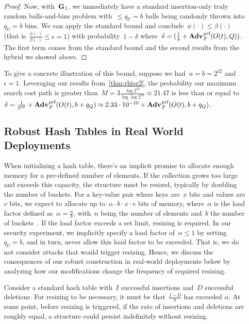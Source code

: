 \begin{proof}
    Now, with~$\textup{\textbf{G}}\hspace{0.5pt}_1$, we immediately have a standard insertion-only truly random balls-and-bins problem with~$\leq q_U = b$ balls being randomly thrown into~$q_U = b$ bins. We can apply the standard bound and conclude~$\phi(\cdot) \leq \beta (\cdot)$ (that is~$\frac{\phi(\cdot)}{\beta (\cdot)} \leq \epsilon = 1$) with probability~$1-\delta$ where~$\delta = (\frac{1}{b} + \Adv{\text{prf}}_{F}(O(t),Q))$. The first term comes from the standard bound and the second results from the hybrid we showed above.
\end{proof} 

To give a concrete illustration of this bound, suppose we had~$n = b = 2^{32}$ and~$\epsilon = 1$. Leveraging our results from~\cref{thm:rhtsr2}, the probability our maximum search cost path is greater than~$M = 3 \frac{\log 2^{32}}{\log\log 2^{32}} \approx 21.47$ is less than or equal to $\delta = \frac{1}{2^{32}} + \Adv{\text{prf}}_{F}(O(t),b+q_Q) \approx 2.33 \cdot 10^{-10} + \Adv{\text{prf}}_{F}(O(t),b+q_Q)$.

\subsection{Robust Hash Tables in Real World Deployments}

When initializing a hash table, there's an implicit promise to allocate enough memory for a pre-defined number of elements. If the collection grows too large and exceeds this capacity, the structure must be resized, typically by doubling the number of buckets. For a key-value pair where keys are~$x$ bits and values are~$v$ bits, we expect to allocate up to~$\alpha \cdot b \cdot x \cdot v$ bits of memory, where~$\alpha$ is the load factor defined as~$\alpha = \frac{n}{b}$, with~$n$ being the number of elements and~$b$ the number of buckets~\cite{clrs}. If the load factor exceeds a set limit, resizing is required. In our security experiment, we implicitly specify a load factor of~$\alpha \leq 1$ by setting~$q_U = b$, and in turn, never allow this load factor to be exceeded. That is, we do not consider attacks that would trigger resizing. Hence, we discuss the consequences of our robust construction in real-world deployments below by analyzing how our modifications change the frequency of required resizing. 

Consider a standard hash table with~$I$ successful insertions and~$D$ successful deletions. For resizing to be necessary, it must be that~$\frac{I-D}{b}$ has exceeded $\alpha$. At some point, before resizing is triggered, if the rate of insertions and deletions are roughly equal, a structure could persist indefinitely without resizing.

